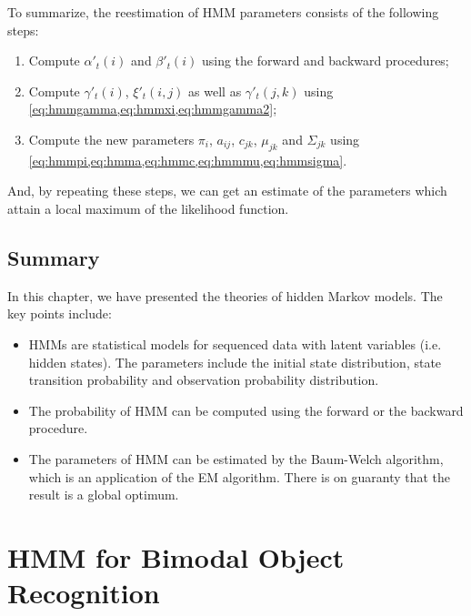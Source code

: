 \documentclass[12pt,final,twoside]{report}
\theoremstyle{plain}
\theoremstyle{definition}
\theoremstyle{remark}
\begin{document}
To summarize, the reestimation of HMM parameters consists of the following steps:
\begin{enumerate}
  \item Compute $\alpha'_t(i)$ and $\beta'_t(i)$ using the forward and backward procedures;
  \item Compute $\gamma'_t(i)$, $\xi'_t(i,j)$ as well as $\gamma'_t(j,k)$ using \cref{eq:hmmgamma,eq:hmmxi,eq:hmmgamma2};
  \item Compute the new parameters $\pi_i$, $a_{ij}$, $c_{jk}$, $\mu_{jk}$ and $\Sigma_{jk}$ using \cref{eq:hmmpi,eq:hmma,eq:hmmc,eq:hmmmu,eq:hmmsigma}.
\end{enumerate}
And, by repeating these steps, we can get an estimate of the parameters which attain a local maximum of the likelihood function.

\section{Summary}
In this chapter, we have presented the theories of hidden Markov models. The key points include:
\begin{itemize}
  \item HMMs are statistical models for sequenced data with latent variables (i.e. hidden states). The parameters include the initial state distribution, state transition probability and observation probability distribution.
  \item The probability of HMM can be computed using the forward or the backward procedure.
  \item The parameters of HMM can be estimated by the Baum-Welch algorithm, which is an application of the EM algorithm. There is on guaranty that the result is a global optimum.
\end{itemize}

\cleardoublepage
\chapter{HMM for Bimodal Object Recognition}
\end{document}
